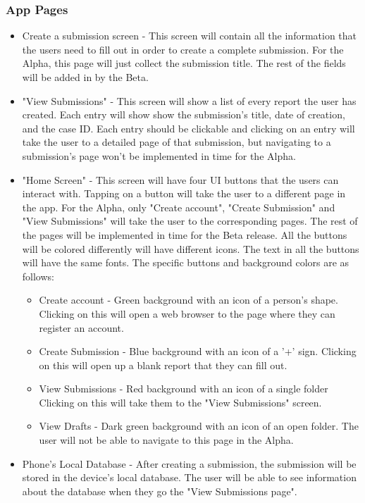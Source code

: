 \documentclass[onecolumn, draftclsnofoot,10pt, compsoc]{IEEEtran}
\begin{document}
\subsubsection{App Pages}
\begin{itemize}
\item Create a submission screen - This screen will contain all the information that the users need to fill out in order to create a complete submission. For the Alpha, this page will just collect the submission title. The rest of the fields will be added in by the Beta.


\item "View Submissions" - This screen will show a list of every report the user has created.  Each entry will show show the submission's title,  date of creation, and the case ID. Each entry should be clickable and clicking on an entry will take the user to a detailed page of that submission, but  navigating to a submission's page won't be implemented in time for the Alpha.

\item "Home Screen" - This screen will have four UI buttons that the users can interact with. Tapping on a button will take the user to a different page in the app. For the Alpha, only "Create account", "Create Submission" and "View Submissions" will take the user to the corresponding pages. The rest of the pages will be implemented in time for the Beta release. All the buttons will be colored differently will have different icons. The text in all the buttons will have the same fonts.  The specific buttons and background colors are as follows:

\begin{itemize}
\item Create account - Green background with an icon of a person's shape. Clicking on this will open a web browser to the page where they can register an account.
\item Create Submission - Blue background with an icon of a '+' sign. Clicking on this will open up a blank report that they can fill out.
\item View Submissions - Red background with an icon of a single folder Clicking on this will take them to the "View Submissions" screen.
\item View Drafts - Dark green background with an icon of an open folder. The user will not be able to navigate to this page in the Alpha.
\end{itemize}


\item Phone's Local Database - After creating a submission, the submission will be stored in the device's local database. The user will be able to see information about the database when they go the "View Submissions page".


\end{itemize}
\end{document}

